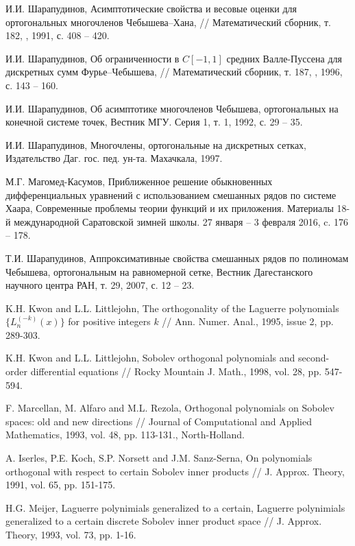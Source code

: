 \begin{thebibliography}{1}
И.И. Шарапудинов,
Асимптотические свойства и весовые оценки для ортогональных многочленов Чебышева–Хана,
// Математический сборник, т. 182, , 1991, с. 408 -- 420.

И.И. Шарапудинов,
Об ограниченности в $C[-1,1]$ средних Валле-Пуссена для дискретных сумм Фурье–Чебышева,
// Математический сборник, т. 187, , 1996, с. 143 -- 160.


И.И. Шарапудинов,
Об асимптотике многочленов Чебышева, ортогональных на конечной системе точек,
Вестник МГУ. Серия 1, т. 1, 1992, с. 29 -- 35.

И.И. Шарапудинов,
Многочлены, ортогональные на дискретных сетках,
Издательство Даг. гос. пед. ун-та. Махачкала, 1997.

М.Г. Магомед-Касумов,
Приближенное решение обыкновенных дифференциальных уравнений с использованием смешанных рядов по системе Хаара,
Современные проблемы теории функций и их приложения. Материалы 18-й международной Саратовской зимней школы.  27 января -- 3 февраля 2016, c. 176 -- 178.

Т.И. Шарапудинов,
Аппроксимативные свойства смешанных рядов по полиномам Чебышева, ортогональным на равномерной сетке,
Вестник Дагестанского научного центра РАН, т. 29, 2007, с. 12 -- 23.

 K.H. Kwon and L.L. Littlejohn, The orthogonality of the Laguerre polynomials $\{L_n^{(-k)}(x)\}$ for positive integers $k$ // Ann. Numer. Anal., 1995, issue 2, pp. 289-303.

 K.H. Kwon and L.L. Littlejohn, Sobolev orthogonal polynomials and second-order differential equations // Rocky Mountain J. Math., 1998, vol. 28, pp. 547-594.

 F. Marcellan, M. Alfaro and M.L. Rezola, Orthogonal polynomials on Sobolev spaces: old and new directions // Journal of Computational and Applied Mathematics, 1993, vol. 48, pp. 113-131., North-Holland.

 A. Iserles, P.E. Koch, S.P. Norsett and J.M. Sanz-Serna, On polynomials  orthogonal  with respect  to certain Sobolev inner products // J. Approx. Theory, 1991, vol. 65, pp. 151-175.

 H.G. Meijer, Laguerre polynimials generalized to a certain,  Laguerre polynimials generalized to a certain discrete Sobolev inner product space // J. Approx. Theory, 1993, vol. 73, pp. 1-16.


\end{thebibliography}
